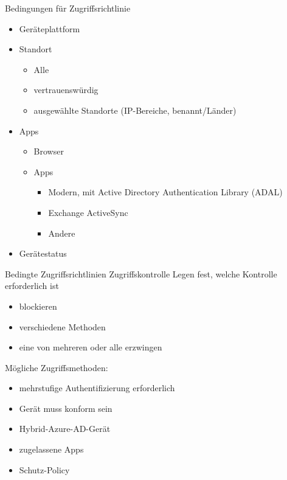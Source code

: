 \begin{flashcard}[Definition]{Bedingungen für Zugriffsrichtlinie}
    \begin{itemize}
        \item Geräteplattform
        \item Standort
            \begin{itemize}
                \item Alle
                \item vertrauenswürdig
                \item ausgewählte Standorte (IP-Bereiche, benannt/Länder)
            \end{itemize}
        \item Apps
            \begin{itemize}
                \item Browser
                \item Apps
                    \begin{itemize}
                        \item Modern, mit Active Directory Authentication Library (ADAL)
                        \item Exchange ActiveSync
                        \item Andere
                    \end{itemize}
            \end{itemize}
        \item Gerätestatus
    \end{itemize}
\end{flashcard}

\begin{flashcard}[Definition]{Bedingte Zugriffsrichtlinien Zugriffskontrolle}
    Legen fest, welche Kontrolle erforderlich ist
    \begin{itemize}
        \item blockieren
        \item verschiedene Methoden
        \item eine von mehreren oder alle erzwingen
    \end{itemize}
    \vspace{1cm}
    Mögliche Zugriffsmethoden:
    \begin{itemize}
        \item mehrstufige Authentifizierung erforderlich
        \item Gerät muss konform sein
        \item Hybrid-Azure-AD-Gerät
        \item zugelassene Apps
        \item Schutz-Policy
    \end{itemize}

\end{flashcard}

